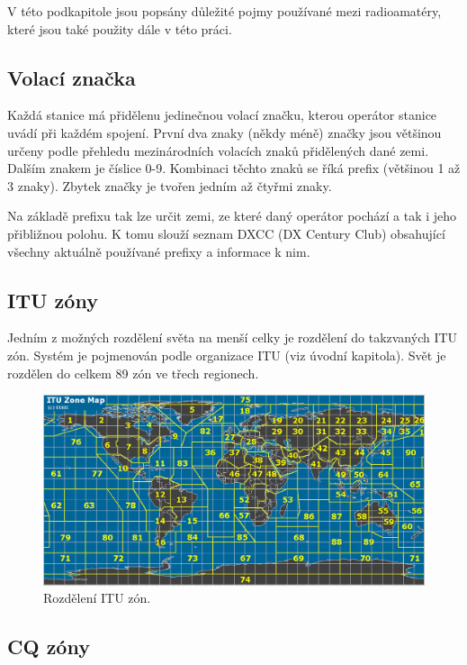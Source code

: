 V této podkapitole jsou popsány důležité pojmy používané mezi radioamatéry, které jsou také použity dále v této práci.

\subsection{Volací značka}

Každá stanice má přidělenu jedinečnou volací značku, kterou operátor stanice uvádí při každém spojení.
První dva znaky (někdy méně) značky jsou většinou určeny podle přehledu mezinárodních volacích znaků
přidělených dané zemi.
Dalším znakem je číslice 0-9. Kombinaci těchto znaků se říká prefix (většinou 1 až
3 znaky). Zbytek značky je tvořen jedním až čtyřmi znaky.

Na základě prefixu tak lze určit zemi, ze které daný operátor pochází a tak i
jeho přibližnou polohu. K tomu slouží seznam DXCC (DX Century Club)%
obsahující všechny aktuálně používané prefixy a informace k nim.

\subsection{ITU zóny}

Jedním z možných rozdělení světa na menší celky je rozdělení do takzvaných ITU zón.
Systém je pojmenován podle organizace ITU (viz úvodní kapitola). Svět je rozdělen do celkem 
89 zón ve třech regionech.

\begin{figure}[h]
\centering
\includegraphics[trim=0cm 0cm 0cm 0cm, scale=0.4]{fig/itu-zone}
\caption{Rozdělení ITU zón.}
\label{fig:FigureExample}
\end{figure}

\subsection{CQ zóny}

